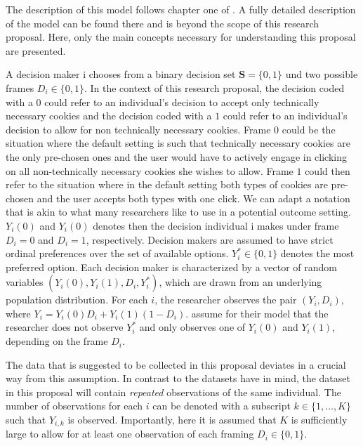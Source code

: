 The description of this model follows chapter one of \textcite{acquisti2015privacy}. A fully detailed description 
of the model can be found there and is beyond the scope of this research proposal. Here, only the main concepts 
necessary for understanding this proposal are presented.

A decision maker i chooses from a binary decision set $ \textbf{S} = \lbrace 0,1 \rbrace  $ und two possible frames $ D_{i} \in \lbrace 0,1 \rbrace $. 
In the context of this research proposal, the decision coded with a $0$ 
could refer to an individual's decision to accept only technically necessary cookies and 
the decision coded with a $ 1 $ could refer to an individual's decision 
to allow for non technically necessary cookies. Frame $ 0 $ could be the situation where the default setting is such that 
technically necessary cookies are the only pre-chosen ones and the user would have to actively engage in clicking on all non-technically necessary 
cookies she wishes to allow. Frame $ 1 $ could then refer to the situation 
where in the default setting both types of cookies are pre-chosen and the user accepts both types with one click. We can adapt a notation that is akin to what many researchers like to use in a potential outcome setting. $ Y_{i}(0) $ and $ Y_{i}(0) $ denotes then the decision individual i makes under frame $ D_{i} = 0 $ and $ D_{i} = 1 $, respectively.
Decision makers are assumed to have strict ordinal preferences over the set of available options. $ Y^{*}_{i} \in \lbrace 0,1 \rbrace $ denotes the most preferred option.
Each decision maker is characterized by a vector of random variables 
$ (Y_i(0), Y_i(1), D_i, Y^*_i) $, which are drawn from an underlying population distribution.
For each $ i $, the researcher observes the pair $ (Y_i, D_i) $, where 
$ Y_i = Y_i(0)D_i + Y_i(1)(1-D_i)$. \textcite{goldin2020} assume for their model 
that the researcher does not observe $ Y^*_i $ and only observes one of $ Y_i(0)$ and $ Y_i(1)$, depending on the frame $D_i$.

The data that is suggested to be collected in this proposal deviates
in a crucial way from this assumption. In contrast to the datasets \textcite{goldin2020}
have in mind, the dataset in this proposal will contain \textit{repeated} observations of the same individual. 
The number of observations for each $ i $ can be denoted with a subscript 
$ k \in \lbrace 1,\dots, K \rbrace $ such that $ Y_{i, k} $ is observed. 
Importantly, here it is assumed that $ K $ is sufficiently large to allow for at 
least one observation of each framing $ D_{i} \in \lbrace 0,1 \rbrace $.

